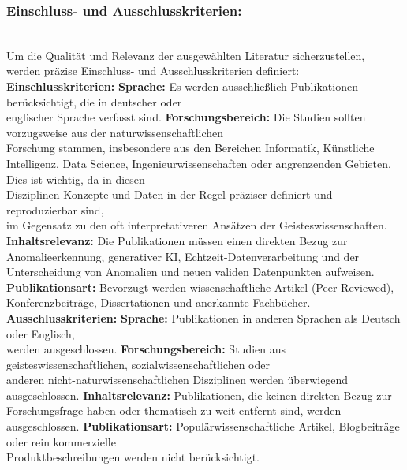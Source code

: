 \subsubsection{Einschluss- und Ausschlusskriterien:}
\\
Um die Qualität und Relevanz der ausgewählten Literatur sicherzustellen, \\ werden präzise Einschluss- und Ausschlusskriterien definiert:
\nAbsatz
\textbf{Einschlusskriterien:}
\nAbsatz
    \textbf{Sprache:} Es werden ausschließlich Publikationen berücksichtigt, die in deutscher oder \\ englischer Sprache verfasst sind.\nAbsatz
    \textbf{Forschungsbereich:} Die Studien sollten vorzugsweise aus der naturwissenschaftlichen \\ Forschung stammen, insbesondere aus den Bereichen Informatik, Künstliche Intelligenz, Data Science, Ingenieurwissenschaften oder angrenzenden Gebieten. Dies ist wichtig, da in diesen \\ Disziplinen Konzepte und Daten in der Regel präziser definiert und reproduzierbar sind, \\ im Gegensatz zu den oft interpretativeren Ansätzen der Geisteswissenschaften.
    \nAbsatz
    \textbf{Inhaltsrelevanz:} Die Publikationen müssen einen direkten Bezug zur Anomalieerkennung, generativer KI, Echtzeit-Datenverarbeitung und der Unterscheidung von Anomalien und neuen validen Datenpunkten aufweisen.
    \nAbsatz
   \textbf{Publikationsart:} Bevorzugt werden wissenschaftliche Artikel (Peer-Reviewed), \\ Konferenzbeiträge, Dissertationen und anerkannte Fachbücher.
\nAbsatz
\textbf{Ausschlusskriterien:}
\nAbsatz
    \textbf{Sprache:} Publikationen in anderen Sprachen als Deutsch oder Englisch, \\ werden ausgeschlossen.
    \nAbsatz
    \textbf{Forschungsbereich:} Studien aus geisteswissenschaftlichen, sozialwissenschaftlichen oder \\ anderen nicht-naturwissenschaftlichen Disziplinen werden überwiegend ausgeschlossen.
    \nAbsatz
    \textbf{Inhaltsrelevanz:} Publikationen, die keinen direkten Bezug zur Forschungsfrage haben oder thematisch zu weit entfernt sind, werden ausgeschlossen.
    \nAbsatz
    \textbf{Publikationsart:} Populärwissenschaftliche Artikel, Blogbeiträge oder rein kommerzielle \\ Produktbeschreibungen werden nicht berücksichtigt.
    \nAbsatz
